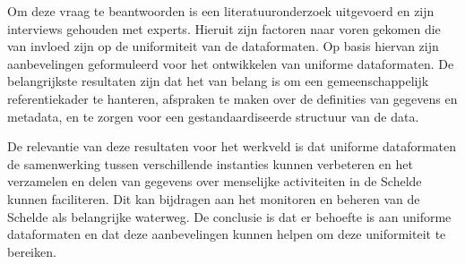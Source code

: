 Om deze vraag te beantwoorden is een literatuuronderzoek uitgevoerd en zijn interviews gehouden met experts. Hieruit zijn factoren naar voren gekomen die van invloed zijn op de uniformiteit van de dataformaten. Op basis hiervan zijn aanbevelingen geformuleerd voor het ontwikkelen van uniforme dataformaten. De belangrijkste resultaten zijn dat het van belang is om een gemeenschappelijk referentiekader te hanteren, afspraken te maken over de definities van gegevens en metadata, en te zorgen voor een gestandaardiseerde structuur van de data.

De relevantie van deze resultaten voor het werkveld is dat uniforme dataformaten de samenwerking tussen verschillende instanties kunnen verbeteren en het verzamelen en delen van gegevens over menselijke activiteiten in de Schelde kunnen faciliteren. Dit kan bijdragen aan het monitoren en beheren van de Schelde als belangrijke waterweg. De conclusie is dat er behoefte is aan uniforme dataformaten en dat deze aanbevelingen kunnen helpen om deze uniformiteit te bereiken.
